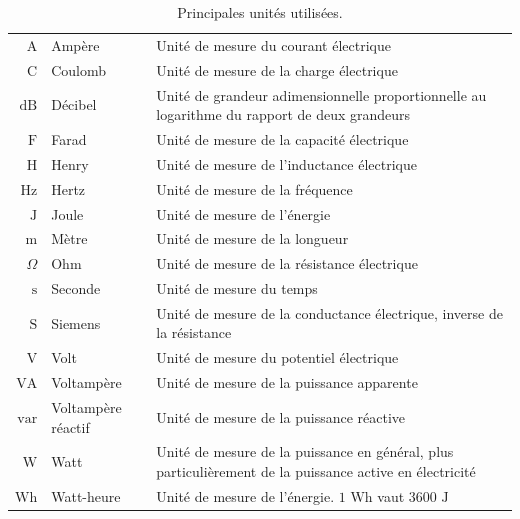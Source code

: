 \begin{table}
	\caption{Principales unités utilisées.}
		\begin{boxedminipage}{\linewidth}
\begin{tabularx}{\linewidth}{rlX}
	$\mathrm{A}$ & Ampère & Unité de mesure du courant électrique\\
	$\mathrm{C}$ & Coulomb & Unité de mesure de la charge électrique\\
	$\mathrm{dB}$ & Décibel & Unité de grandeur adimensionnelle proportionnelle au logarithme du rapport de deux grandeurs \\
	$\mathrm{F}$ & Farad & Unité de mesure de la capacité électrique\\
	$\mathrm{H}$ & Henry & Unité de mesure de l'inductance électrique \\
	$\mathrm{Hz}$ & Hertz & Unité de mesure de la fréquence \\
	$\mathrm{J}$ & Joule & Unité de mesure de l'énergie \\
	$\mathrm{m}$ & Mètre & Unité de mesure de la longueur \\
	$\Omega$ & Ohm & Unité de mesure de la résistance électrique\\
	$\mathrm{s}$ & Seconde & Unité de mesure du temps\\
	$\mathrm{S}$ & Siemens & Unité de mesure de la conductance électrique, inverse de la résistance \\
	$\mathrm{V}$ & Volt & Unité de mesure du potentiel électrique\\
	$\mathrm{VA}$ & Voltampère & Unité de mesure de la puissance apparente\\
	$\mathrm{var}$ & Voltampère réactif  & Unité de mesure de la puissance réactive\\
	$\mathrm{W}$ & Watt & Unité de mesure de la puissance en général, plus particulièrement de la puissance active en électricité\\
	$\mathrm{Wh}$ & Watt-heure & Unité de mesure de l'énergie. $1\text{ Wh}$ vaut $3600\text{ J}$
\end{tabularx}
\end{boxedminipage}
\end{table}

%
